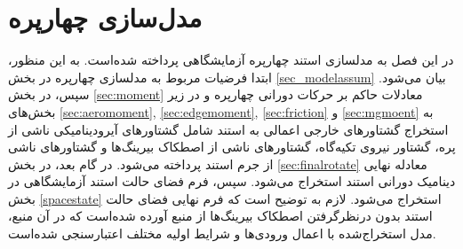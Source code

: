 \chapter{مدل‌سازی چهارپره}
 در این فصل به مدلسازی استند چهارپره آزمایشگاهی  پرداخته شده‌است. به این منظور، ابتدا فرضیات مربوط به 
 مدلسازی چهارپره در بخش
\ref{sec_modelassum}
 بیان می‌شود. سپس، در بخش
 \ref{sec:moment}
 معادلات حاکم بر حرکات دورانی چهارپره و در زیر بخش‌های
 \ref{sec:aeromoment},
 \ref{sec:edgemoment},
 \ref{sec:friction}
 و
 \ref{sec:mgmoent}
   به استخراج گشتاورهای خارجی اعمالی 
 به استند شامل گشتاورهای آیرودینامیکی ناشی از پره، گشتاور نیروی تکیه‌گاه، گشتاورهای ناشی از 
 اصطکاک بیرینگ‌ها و  گشتاورهای ناشی از جرم استند پرداخته می‌شود. در گام بعد، در بخش
 \ref{sec:finalrotate}
 معادله نهایی دینامیک دورانی استند 
 استخراج می‌شود. سپس، فرم فضای حالت استند آزمایشگاهی در بخش
 \ref{spacestate}
 استخراج می‌شود. لازم به 
 توضیح است که فرم نهایی فضای حالت استند بدون درنظرگرفتن اصطکاک بیرینگ‌ها از منبع
 \cite{Abeshtan}
 آورده ‌شده‌است که در آن منبع، مدل استخراج‌شده با اعمال ورودی‌ها و شرایط اولیه مختلف 
 اعتبارسنجی شده‌‌است.